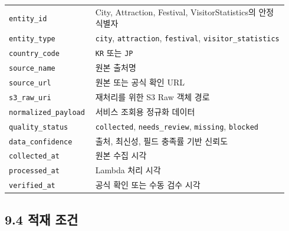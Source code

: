 \documentclass[12pt,a4paper]{article}
\newcommand{\DocNeedspace}[1]{\par\ifdim\dimexpr\pagegoal-\pagetotal\relax<#1\newpage\fi}
\begin{document}
\DocNeedspace{30\baselineskip}
\begin{small}
\begin{longtable}{@{}>{\RaggedRight\arraybackslash}m{0.270\linewidth}>{\RaggedRight\arraybackslash}m{0.670\linewidth}@{}}
\toprule
\multicolumn{1}{>{\centering\arraybackslash}m{0.270\linewidth}}{\textbf{속성}} & \multicolumn{1}{>{\centering\arraybackslash}m{0.670\linewidth}}{\textbf{설명}} \\
\midrule
\endhead
\texttt{entity\_\allowbreak{}id} & City, Attraction, Festival, VisitorStatistics의 안정 식별자 \\
\texttt{entity\_\allowbreak{}type} & \texttt{city}, \texttt{attraction}, \texttt{festival}, \texttt{visitor\_\allowbreak{}statistics} \\
\texttt{country\_\allowbreak{}code} & \texttt{KR} 또는 \texttt{JP} \\
\texttt{source\_\allowbreak{}name} & 원본 출처명 \\
\texttt{source\_\allowbreak{}url} & 원본 또는 공식 확인 URL \\
\texttt{s3\_\allowbreak{}raw\_\allowbreak{}uri} & 재처리를 위한 S3 Raw 객체 경로 \\
\texttt{normalized\_\allowbreak{}payload} & 서비스 조회용 정규화 데이터 \\
\texttt{quality\_\allowbreak{}status} & \texttt{collected}, \texttt{needs\_\allowbreak{}review}, \texttt{missing}, \texttt{blocked} \\
\texttt{data\_\allowbreak{}confidence} & 출처, 최신성, 필드 충족률 기반 신뢰도 \\
\texttt{collected\_\allowbreak{}at} & 원본 수집 시각 \\
\texttt{processed\_\allowbreak{}at} & Lambda 처리 시각 \\
\texttt{verified\_\allowbreak{}at} & 공식 확인 또는 수동 검수 시각 \\
\bottomrule
\end{longtable}
\end{small}


\DocNeedspace{24\baselineskip}
\subsection*{9.4 적재 조건}
\end{document}
